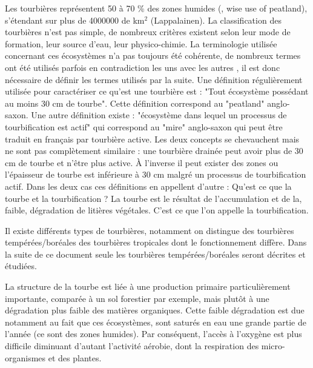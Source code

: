 Les tourbières représentent 50 à 70 \% des zones humides (\cite{francez2000}, wise use of peatland), s'étendant sur plus de 4000000 de km$^{2}$ (Lappalainen).
La classification des tourbières n'est pas simple, de nombreux critères existent selon leur mode de formation, leur source d'eau, leur physico-chimie.
La terminologie utilisée concernant ces écosystèmes n'a pas toujours été cohérente, de nombreux termes ont été utilisés parfois en contradiction les uns avec les autres \cite{joosten2002}, il est donc nécessaire de définir les termes utilisés par la suite. 
Une définition régulièrement utilisée pour caractériser ce qu'est une tourbière est : "Tout écosystème possédant au moins 30 cm de tourbe".
Cette définition correspond au "peatland" anglo-saxon.
Une autre définition existe  : "écosystème dans lequel un processus de tourbification est actif" qui correspond au "mire" anglo-saxon qui peut être traduit en français par tourbière active.
Les deux concepts se chevauchent mais ne sont pas complètement similaire : une tourbière drainée peut avoir plus de 30 cm de tourbe et n'être plus active.
À l'inverse il peut exister des zones ou l'épaisseur de tourbe est inférieure à 30 cm malgré un processus de tourbification actif.
Dans les deux cas ces définitions en appellent d'autre : Qu'est ce que la tourbe et la tourbification ?
La tourbe est le résultat de l'accumulation et de la, faible, dégradation de litières végétales.
C'est ce que l'on appelle la tourbification.

Il existe différents types de tourbières, notamment on distingue des tourbières tempérées/boréales des tourbières tropicales dont le fonctionnement diffère.
Dans la suite de ce document seule les tourbières tempérées/boréales seront décrites et étudiées.


La structure de la tourbe est liée à une production primaire particulièrement importante, comparée à un sol forestier par exemple, mais plutôt à une dégradation plus faible des matières organiques.
Cette faible dégradation est due notamment au fait que ces écosystèmes, sont saturés en eau une grande partie de l'année (ce sont des zones humides). 
Par conséquent, l'accès à l'oxygène est plus difficile diminuant d'autant l'activité aérobie, dont la respiration des micro-organismes et des plantes.


